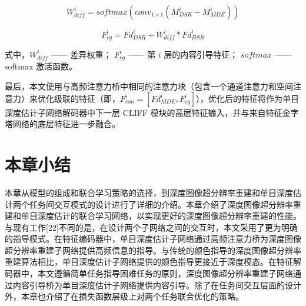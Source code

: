 \begin{equation}
	W_{diff}^i=softmax\left(conv_{1\times1}\left(M_{DSR}^i-M_{MDE}^i\right)\right)
		\label{equ:equ3-19}
\end{equation}

\begin{equation}
	F_{cg}^i=Fd_{DSR}^i+W_{diff}^i\ast Fd_{DSR}^i
	\label{equ:equ3-20}
\end{equation}

\noindent 式中，$W_{diff}^i$ —— 差异权重；\newline
\indent\quad $F_{cg}^i$ —— 第 $i$ 层的内容引导特征；\newline
\indent\quad $softmax$ —— softmax 激活函数。

最后，本文使用与高频注意力桥中相同的注意力块（包含一个通道注意力和空间注意力）来优化级联的特征（即，$F_{con}^i=\left[Fd_{MDE}^i,F_{cg}^i\right]$），优化后的特征将作为单目深度估计子网络解码器中下一层 CLIFF 模块的高层特征输入，并与来自特征金字塔网络的底层特征进一步融合。

\section{本章小结}

本章从模型的组成和联合学习策略的选择，到深度图像超分辨率重建和单目深度估计两个任务间交互模式的设计进行了详细的介绍。本章介绍了深度图像超分辨率重建和单目深度估计的联合学习网络，以实现更好的深度图像超分辨率重建的性能。与现有工作[22]不同的是，在设计两个子网络之间的交互时，本文采用了更为明确的指导模式。在特征编码器中，单目深度估计子网络通过高频注意力桥为深度图像超分辨率重建子网络提供高频信息的指导。与传统的颜色指导的深度图像超分辨率重建算法相比，单目深度估计子网络提供的颜色指导更接近于深度模态。在特征解码器中，本文遵循简单任务指导困难任务的原则，深度图像超分辨率重建子网络通过内容引导桥为单目深度估计子网络提供内容引导。除了在任务间交互层面的设计外，本章也介绍了在损失函数层级上对两个任务联合优化的策略。

